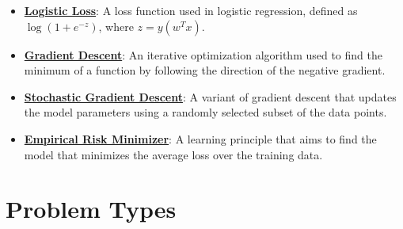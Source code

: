 \documentclass{article}%
\begin{document}
\begin{itemize}[leftmargin=*]
\item \href{https://purdue.brightspace.com/d2l/common/assets/pdfjs-d2l-dist/1.0.14-legacy/web/viewer.html?file=\%2Fcontent\%2Fenforced\%2F1095467-wl.202510.CS.24300.001\%2F05L2-ML Basics.pdf\%3Fou\%3D1095467\&lang=en-us\&container=d2l-fileviewer-rendered-pdf\&fullscreen=d2l-fileviewer-rendered-pdf-dialog\&height=667#page=27}{\textbf{Logistic Loss}}: A loss function used in logistic regression, defined as $\log(1 + e^{-z})$, where $z = y(w^Tx)$.%
\item \href{https://purdue.brightspace.com/d2l/common/assets/pdfjs-d2l-dist/1.0.14-legacy/web/viewer.html?file=\%2Fcontent\%2Fenforced\%2F1095467-wl.202510.CS.24300.001\%2F05L2-ML Basics.pdf\%3Fou\%3D1095467\&lang=en-us\&container=d2l-fileviewer-rendered-pdf\&fullscreen=d2l-fileviewer-rendered-pdf-dialog\&height=667#page=28}{\textbf{Gradient Descent}}: An iterative optimization algorithm used to find the minimum of a function by following the direction of the negative gradient.%
\item \href{https://purdue.brightspace.com/d2l/common/assets/pdfjs-d2l-dist/1.0.14-legacy/web/viewer.html?file=\%2Fcontent\%2Fenforced\%2F1095467-wl.202510.CS.24300.001\%2F05L2-ML Basics.pdf\%3Fou\%3D1095467\&lang=en-us\&container=d2l-fileviewer-rendered-pdf\&fullscreen=d2l-fileviewer-rendered-pdf-dialog\&height=667#page=29}{\textbf{Stochastic Gradient Descent}}: A variant of gradient descent that updates the model parameters using a randomly selected subset of the data points.%
\item \href{https://purdue.brightspace.com/d2l/common/assets/pdfjs-d2l-dist/1.0.14-legacy/web/viewer.html?file=\%2Fcontent\%2Fenforced\%2F1095467-wl.202510.CS.24300.001\%2F05L2-ML Basics.pdf\%3Fou\%3D1095467\&lang=en-us\&container=d2l-fileviewer-rendered-pdf\&fullscreen=d2l-fileviewer-rendered-pdf-dialog\&height=667#page=15}{\textbf{Empirical Risk Minimizer}}: A learning principle that aims to find the model that minimizes the average loss over the training data.%
\end{itemize}

%
\section{Problem Types}%
\label{sec:ProblemTypes}%
\end{document}
